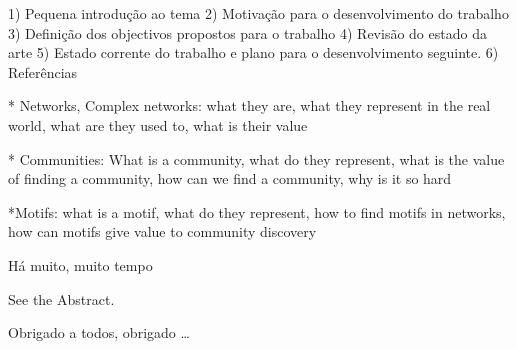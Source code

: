 
1) Pequena introdução ao tema
2) Motivação para o desenvolvimento do trabalho
3) Definição dos objectivos propostos para o trabalho
4) Revisão do estado da arte
5) Estado corrente do trabalho e plano para o desenvolvimento seguinte.
6) Referências

* Networks, Complex networks: what they are, what they represent in the real world, what are they used to, what is their value

* Communities: What is a community, what do they represent, what is the value of finding a community, how can we find a community, why is it so hard

*Motifs: what is a motif, what do they represent, how to find motifs in networks, how can motifs give value to community discovery


Há muito, muito tempo

See the Abstract.



Obrigado a todos, obrigado \ldots
